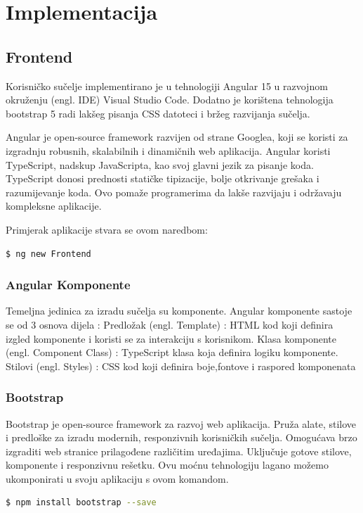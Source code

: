 \documentclass[times, utf8, zavrsni]{fer}
\begin{document}
\chapter{Implementacija}
\section{Frontend}
 Korisničko sučelje implementirano je u tehnologiji Angular 15 u razvojnom okruženju (engl. IDE) Visual Studio Code. Dodatno je korištena tehnologija bootstrap 5
radi lakšeg pisanja CSS datoteci i bržeg razvijanja sučelja. \cite{angular}

 Angular je open-source framework razvijen od strane Googlea, koji se koristi za izgradnju robusnih, skalabilnih i dinamičnih web aplikacija. 
Angular koristi TypeScript, nadskup JavaScripta, kao svoj glavni jezik za pisanje koda. TypeScript donosi prednosti statičke tipizacije, bolje otkrivanje grešaka i razumijevanje koda. Ovo pomaže programerima da lakše razvijaju i održavaju kompleksne aplikacije.

Primjerak aplikacije stvara se ovom naredbom: 
\begin{lstlisting}[language=bash]
   $ ng new Frontend
\end{lstlisting}
 
\subsection{Angular Komponente}
Temeljna jedinica za izradu sučelja su komponente. Angular komponente sastoje se od 3 osnova dijela : 
Predložak (engl. Template) : HTML kod koji definira izgled komponente i koristi se za interakciju s korisnikom.
Klasa komponente (engl. Component Class) : TypeScript klasa koja definira logiku komponente.
Stilovi (engl. Styles) : CSS kod koji definira boje,fontove i raspored komponenata

\subsection{Bootstrap}
Bootstrap je open-source framework za razvoj web aplikacija. Pruža alate, stilove i predloške za izradu modernih, responzivnih korisničkih sučelja. Omogućava brzo izgraditi web stranice prilagođene različitim uređajima. 
Uključuje gotove stilove, komponente i responzivnu rešetku. Ovu  moćnu tehnologiju lagano možemo ukomponirati u svoju aplikaciju s ovom komandom.

\begin{lstlisting}[language= bash]
   $ npm install bootstrap --save
\end{lstlisting}
\end{document}
